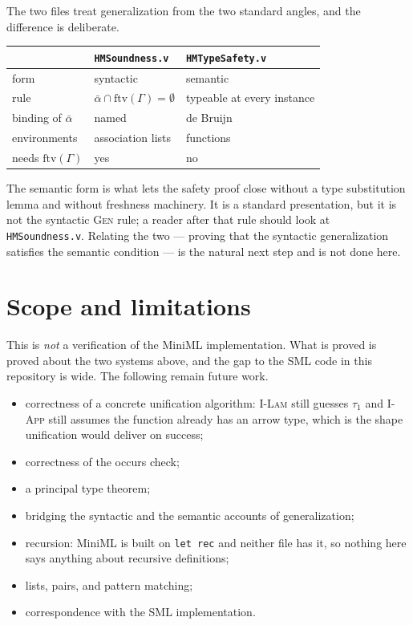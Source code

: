 \documentclass[11pt,a4paper]{article}
\newcommand{\ftv}{\mathrm{ftv}}
\begin{document}
The two files treat generalization from the two standard angles, and the
difference is deliberate.

\begin{center}
\begin{tabular}{lll}
  & \texttt{HMSoundness.v} & \texttt{HMTypeSafety.v} \\
  \hline
  form & syntactic & semantic \\
  rule & $\bar\alpha \cap \ftv(\Gamma) = \emptyset$
       & typeable at every instance \\
  binding of $\bar\alpha$ & named & de Bruijn \\
  environments & association lists & functions \\
  needs $\ftv(\Gamma)$ & yes & no \\
\end{tabular}
\end{center}

The semantic form is what lets the safety proof close without a type
substitution lemma and without freshness machinery.  It is a standard
presentation, but it is not the syntactic \textsc{Gen} rule; a reader after
that rule should look at \texttt{HMSoundness.v}.  Relating the two --- proving
that the syntactic generalization satisfies the semantic condition --- is the
natural next step and is not done here.

\section{Scope and limitations}
\label{sec:limits}

This is \emph{not} a verification of the MiniML implementation.  What is proved
is proved about the two systems above, and the gap to the SML code in this
repository is wide.  The following remain future work.

\begin{itemize}
  \item correctness of a concrete unification algorithm: \textsc{I-Lam} still
  guesses $\tau_1$ and \textsc{I-App} still assumes the function already has an
  arrow type, which is the shape unification would deliver on success;
  \item correctness of the occurs check;
  \item a principal type theorem;
  \item bridging the syntactic and the semantic accounts of generalization;
  \item recursion: MiniML is built on \texttt{let rec} and neither file has it,
  so nothing here says anything about recursive definitions;
  \item lists, pairs, and pattern matching;
  \item correspondence with the SML implementation.
\end{itemize}
\end{document}
